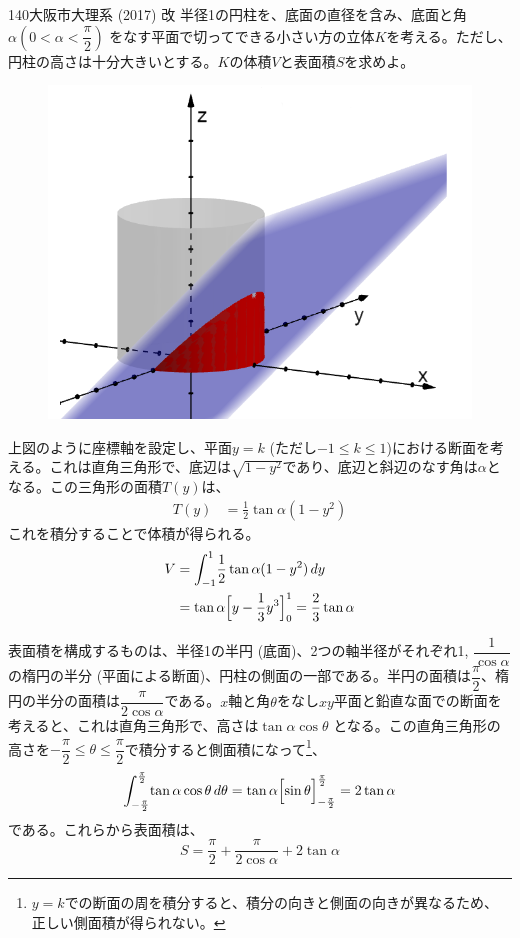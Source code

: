 \begin{thm}{140}{}{大阪市大理系 (2017) 改}
 半径1の円柱を、底面の直径を含み、底面と角$\alpha (0<\alpha<\dfrac{\pi}{2})$ をなす平面で切ってできる小さい方の立体$K$を考える。ただし、円柱の高さは十分大きいとする。$K$の体積$V$と表面積$S$を求めよ。
\end{thm}

\begin{figure}[H]
 \centering
 \includegraphics[width=0.7\linewidth]{../problems/Q_140/A_140.png}
\end{figure}
上図のように座標軸を設定し、平面$y=k$ (ただし$-1\le k\le 1$)における断面を考える。これは直角三角形で、底辺は$\sqrt{1-y^2}$であり、底辺と斜辺のなす角は$\alpha$となる。この三角形の面積$T(y)$は、
\begin{align*}
 T(y)&=\frac{1}{2}\tan\alpha (1-y^2)
\end{align*}
これを積分することで体積が得られる。
\begin{align*}
 V&=\int_{-1}^1\! \frac{1}{2}\tan\alpha (1-y^2) \,dy \\
 &=\tan\alpha\Bigl[y-\frac{1}{3}y^3\Bigr]_0^1=\frac{2}{3}\tan\alpha
\end{align*}

表面積を構成するものは、半径1の半円 (底面)、2つの軸半径がそれぞれ1, $\dfrac{1}{\cos\alpha}$の楕円の半分 (平面による断面)、円柱の側面の一部である。半円の面積は$\dfrac{\pi}{2}$、楕円の半分の面積は$\dfrac{\pi}{2\cos\alpha}$である。$x$軸と角$\theta$をなし$xy$平面と鉛直な面での断面を考えると、これは直角三角形で、高さは$\tan\alpha\cos\theta$ となる。この直角三角形の高さを$-\dfrac{\pi}{2}\le\theta\le\dfrac{\pi}{2}$で積分すると側面積になって\footnote{$y=k$での断面の周を積分すると、積分の向きと側面の向きが異なるため、正しい側面積が得られない。}、
\begin{align*}
 \int_{-\frac{\pi}{2}}^{\frac{\pi}{2}}\!\tan\alpha\cos\theta\,d\theta=\tan\alpha\Bigl[\sin\theta\Bigr]_{-\frac{\pi}{2}}^{\frac{\pi}{2}}=2\tan\alpha
\end{align*}
である。これらから表面積は、
\[ S=\frac{\pi}{2}+\frac{\pi}{2\cos\alpha}+2\tan\alpha \]

